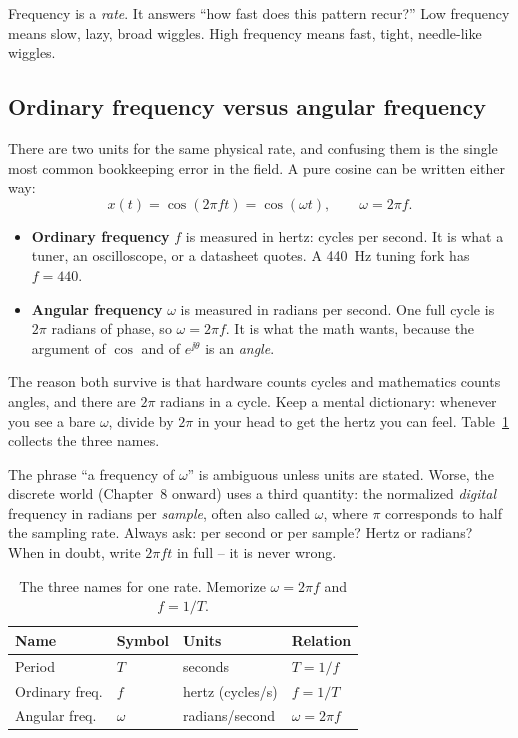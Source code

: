 \begin{intuitionbox}
Frequency is a \emph{rate}. It answers ``how fast does this pattern recur?'' Low
frequency means slow, lazy, broad wiggles. High frequency means fast, tight,
needle-like wiggles. 
\end{intuitionbox}

\subsection{Ordinary frequency versus angular frequency}

There are two units for the same physical rate, and confusing them is the single
most common bookkeeping error in the field. A pure cosine can be written either way:
\[
  x(t) = \cos(2\pi f t) = \cos(\omega t), \qquad \omega = 2\pi f.
\]
\begin{itemize}
  \item \textbf{Ordinary frequency} $f$ is measured in hertz: cycles per second.
        It is what a tuner, an oscilloscope, or a datasheet quotes. A 440~Hz tuning
        fork has $f = 440$.
  \item \textbf{Angular frequency} $\omega$ is measured in radians per second. One
        full cycle is $2\pi$ radians of phase, so $\omega = 2\pi f$. It is what the
        math wants, because the argument of $\cos$ and of $e^{\jj\theta}$ is an
        \emph{angle}.
\end{itemize}
The reason both survive is that hardware counts cycles and mathematics counts angles,
and there are $2\pi$ radians in a cycle. Keep a mental dictionary: whenever you see a
bare $\omega$, divide by $2\pi$ in your head to get the hertz you can feel.
Table~\ref{ch05:units} collects the three names.

\begin{trapbox}
The phrase ``a frequency of $\omega$'' is ambiguous unless units are stated. Worse,
the discrete world (Chapter~8 onward) uses a third quantity: the normalized
\emph{digital} frequency in radians per \emph{sample}, often also called $\omega$,
where $\pi$ corresponds to half the sampling rate. Always ask: per second or per
sample? Hertz or radians? When in doubt, write $2\pi f t$ in full -- it is never
wrong.
\end{trapbox}

\begin{table}[H]
\centering
\begin{tabular}{@{}llll@{}}
\toprule
Name & Symbol & Units & Relation \\
\midrule
Period            & $T$      & seconds            & $T = 1/f$ \\
Ordinary freq.    & $f$      & hertz (cycles/s)   & $f = 1/T$ \\
Angular freq.     & $\omega$ & radians/second     & $\omega = 2\pi f$ \\
\bottomrule
\end{tabular}
\caption{The three names for one rate. Memorize $\omega = 2\pi f$ and $f = 1/T$.}
\label{ch05:units}
\end{table}

